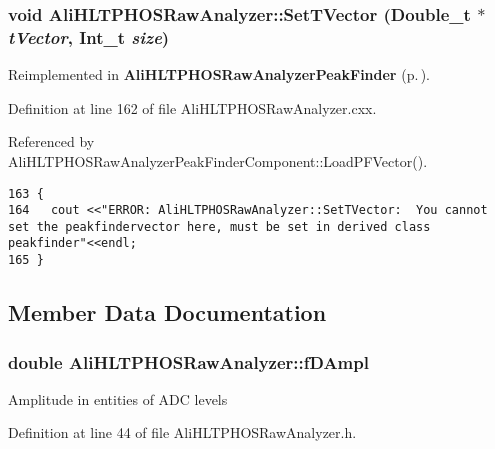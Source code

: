 \subsubsection{\setlength{\rightskip}{0pt plus 5cm}void Ali\-HLTPHOSRaw\-Analyzer::Set\-TVector (Double\_\-t $\ast$ {\em t\-Vector}, Int\_\-t {\em size})\hspace{0.3cm}{\tt  [virtual, inherited]}}\label{classAliHLTPHOSRawAnalyzer_AliHLTPHOSRawAnalyzerLMSa16}




Reimplemented in {\bf Ali\-HLTPHOSRaw\-Analyzer\-Peak\-Finder} {\rm (p.\,\pageref{classAliHLTPHOSRawAnalyzerPeakFinder_AliHLTPHOSRawAnalyzerPeakFindera4})}.

Definition at line 162 of file Ali\-HLTPHOSRaw\-Analyzer.cxx.

Referenced by Ali\-HLTPHOSRaw\-Analyzer\-Peak\-Finder\-Component::Load\-PFVector().

\footnotesize\begin{verbatim}163 {
164   cout <<"ERROR: AliHLTPHOSRawAnalyzer::SetTVector:  You cannot set the peakfindervector here, must be set in derived class peakfinder"<<endl;
165 }
\end{verbatim}\normalsize 




\subsection{Member Data Documentation}
\subsubsection{\setlength{\rightskip}{0pt plus 5cm}double {\bf Ali\-HLTPHOSRaw\-Analyzer::f\-DAmpl}\hspace{0.3cm}{\tt  [protected, inherited]}}\label{classAliHLTPHOSRawAnalyzer_AliHLTPHOSRawAnalyzerPeakFinderp6}


Amplitude in entities of ADC levels 

Definition at line 44 of file Ali\-HLTPHOSRaw\-Analyzer.h.
